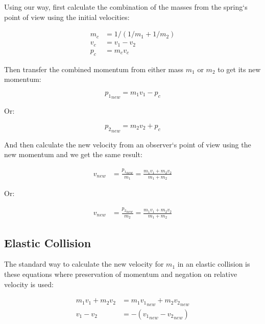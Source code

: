 \documentclass[]{../common/elementary-physics}
\begin{document}
Using our way, first calculate the combination of the masses from the spring`s point of view using the initial velocities:

\begin{subequations}
\begin{align}
m_c &= 1/(1/m_1 + 1/m_2) \\
v_c &= v_1 - v_2 \\
p_c &= m_c v_c
\end{align}
\end{subequations}

Then transfer the combined momentum from either mass $m_1$ or $m_2$ to get its new momentum:

\begin{equation}
{p_1}_{new} = m_1 v_1 - p_c
\end{equation}

Or:

\begin{equation}
{p_2}_{new} = m_2 v_2 + p_c
\end{equation}

And then calculate the new velocity from an observer`s point of view using the new momentum and we get the same result:

\begin{subequations}
\begin{align}
{v}_{new} &= \frac{{p_1}_{new}}{m_1} = \frac{m_1 v_1 + m_2 v_2}{m_1 + m_2}
\end{align}
\end{subequations}

Or:

\begin{subequations}
\begin{align}
{v}_{new} &= \frac{{p_2}_{new}}{m_2} = \frac{m_1 v_1 + m_2 v_2}{m_1 + m_2}
\end{align}
\end{subequations}

\subsection{Elastic Collision}

The standard way to calculate the new velocity for $m_1$ in an elastic collision is these equations where preservation of momentum and negation on relative velocity is used:

\begin{subequations}
\begin{align}
m_1 v_1 + m_2 v_2 &= m_1 {v_1}_{new} + m_2 {v_2}_{new} \\
v_1 - v_2 &= -({v_1}_{new} - {v_2}_{new}) \\
\end{align}
\end{subequations}
\end{document}
